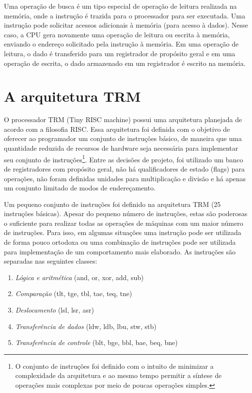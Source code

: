 \documentclass[11pt,a4paper]{report}
\begin{document}
Uma operação de busca é um tipo especial de operação de leitura realizada
na memória, onde a instrução é trazida para o processador para ser
executada. Uma instrução pode solicitar acessos adicionais à memória
(para acesso à dados). Nesse caso, a CPU gera novamente uma operação
de leitura ou escrita à memória, enviando o endereço solicitado pela
instrução à memória. Em uma operação de leitura, o dado é transferido
para um registrador de propósito geral e em uma operação de escrita,
o dado armazenado em um registrador é escrito na memória.


\chapter{A arquitetura TRM}

O processador TRM (Tiny RISC machine) possui uma arquitetura planejada
de acordo com a filosofia RISC. Essa arquitetura foi definida com o
objetivo de oferecer ao programador um conjunto de instruções básico, de
maneira que uma quantidade reduzida de recursos de hardware seja
necessária para implementar seu conjunto de instruções\footnote{O conjunto
de instruções foi definido com o intuito de minimizar a complexidade da
arquitetura e ao mesmo tempo permitir a síntese de operações mais
complexas por meio de poucas operações simples.}. Entre as decisões de
projeto, foi utilizado um banco de registradores com propósito geral,
não há qualificadores de estado (flags) para operações, não foram
definidas unidades para multiplicação e divisão e há apenas um conjunto
limitado de modos de endereçamento.

Um pequeno conjunto de instruções foi definido na arquitetura TRM (25
instruções básicas). Apesar do pequeno número de instruções, estas são 
poderosas o suficiente para realizar todas as operações de máquinas com
um maior número de instruções. Para isso, em algumas situações uma
instrução pode ser utilizada de forma pouco ortodoxa ou uma combinação
de instruções pode ser utilizada para implementação de um comportamento
mais elaborado. As instruções são separadas nas seguintes classes:

\begin{enumerate}
\item \textit{Lógica e aritmética} (and, or, xor, add, sub)
\item \textit{Comparação} (tlt, tge, tbl, tae, teq, tne)
\item \textit{Deslocamento} (lsl, lsr, asr)
\item \textit{Transferência de dados} (ldw, ldb, lbu, stw, stb)
\item \textit{Transferência de controle} (blt, bge, bbl, bae, beq, bne)
\end{enumerate}
\end{document}
